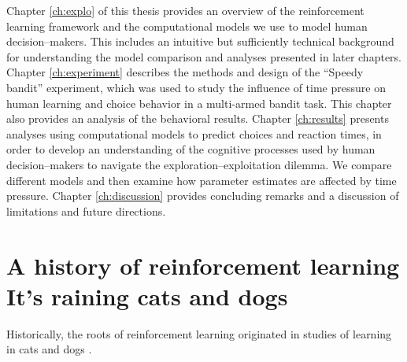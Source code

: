 Chapter \ref{ch:explo} of this thesis provides an overview of the reinforcement learning framework and the computational models we use to model human decision--makers. This includes an intuitive but sufficiently technical background for understanding the model comparison and analyses presented in later chapters. %
Chapter \ref{ch:experiment} describes the methods and design of the ``Speedy bandit'' experiment, which was used to study the influence of time pressure on human learning and choice behavior in a multi-armed bandit task. This chapter also provides an analysis of the behavioral results.
Chapter \ref{ch:results} presents analyses using computational models to predict choices and reaction times, in order to develop an understanding of the cognitive processes used by human decision--makers to navigate the exploration--exploitation dilemma. %
We compare different models and then examine how parameter estimates are affected by time pressure. %
Chapter \ref{ch:discussion} provides concluding remarks and a discussion of limitations and future directions. 



\section[A history of reinforcement learning. It's raining cats and dogs]{A history of reinforcement learning\\ {\large It's raining cats and dogs}} 

Historically, the roots of reinforcement learning originated in studies of learning in cats \citep{thorndike1927law} and dogs \citep{pavlov1927conditional}.

